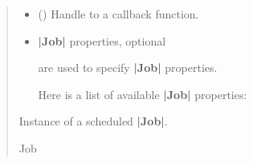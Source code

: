 \documentclass[letterpaper,10pt,english]{sphinxmanual}
\begin{document}
\begin{fulllineitems}
\begin{fulllineitems}
\begin{quote}
\begin{description}
\begin{itemize}
\item {} 
\sphinxAtStartPar
{} (\sphinxstyleliteralemphasis{\sphinxupquote{{[}}}\sphinxstyleliteralemphasis{\sphinxupquote{, }}\sphinxstyleliteralemphasis{\sphinxupquote{{]}}}) \textendash{} Handle to a callback function.

\item {} 
\sphinxAtStartPar
{} \textendash{} 
\sphinxAtStartPar
{\color{red}\bfseries{}|Job|} properties, optional

\sphinxAtStartPar
{} are used to specify {\color{red}\bfseries{}|Job|} properties.

\sphinxAtStartPar
Here is a list of available {\color{red}\bfseries{}|Job|} properties:


\end{itemize}

\sphinxAtStartPar
Instance of a scheduled {\color{red}\bfseries{}|Job|}.

\sphinxAtStartPar
Job

\end{description}\end{quote}

\end{fulllineitems}



\end{fulllineitems}
\end{document}
